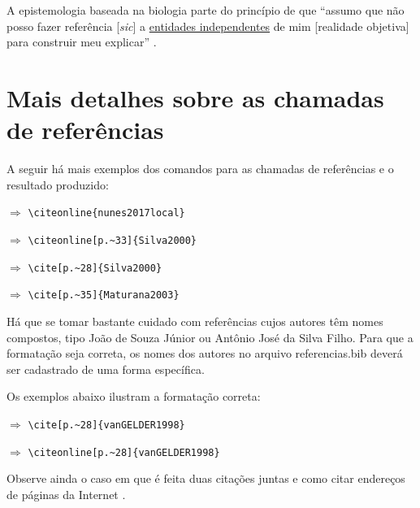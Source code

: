 \begin{apendicesenv}
    A epistemologia baseada na biologia parte do princípio de que ``assumo que não posso fazer referência [\textit{sic}] a \underline{entidades independentes} de mim [realidade objetiva] para construir meu explicar'' \cite[p.~35, comentários e grifo nosso]{Maturana2003}.

    \section{Mais detalhes sobre as chamadas de referências}
    \label{sec_chamadas_referencias}

    A seguir há mais exemplos dos comandos para as chamadas de referências e o resultado produzido:

     $\Longrightarrow$ \verb|\citeonline{nunes2017local}|

     $\Longrightarrow$ \verb|\citeonline[p.~33]{Silva2000}|

    \cite[p.~28]{Silva2000} $\Longrightarrow$ \verb|\cite[p.~28]{Silva2000}|

    \cite[p.~35]{Maturana2003} $\Longrightarrow$ \verb|\cite[p.~35]{Maturana2003}|

    \vspace{4ex}

    Há que se tomar bastante cuidado com referências cujos autores têm nomes compostos, tipo João de Souza Júnior ou Antônio José da Silva Filho.
    Para que a formatação seja correta, os nomes dos autores no arquivo {\color{red} referencias.bib} deverá ser cadastrado de uma forma específica.

    Os exemplos abaixo ilustram a formatação correta:

    \cite[p.~28]{vanGELDER1998} $\Longrightarrow$ \verb|\cite[p.~28]{vanGELDER1998}|

     $\Longrightarrow$ \verb|\citeonline[p.~28]{vanGELDER1998}|

    \vspace{4ex}

    Observe ainda o caso em que é feita duas citações juntas \cite{Silva2000, nunes2017local} e como citar endereços de páginas da Internet \cite{IRL2014}.



\end{apendicesenv}
